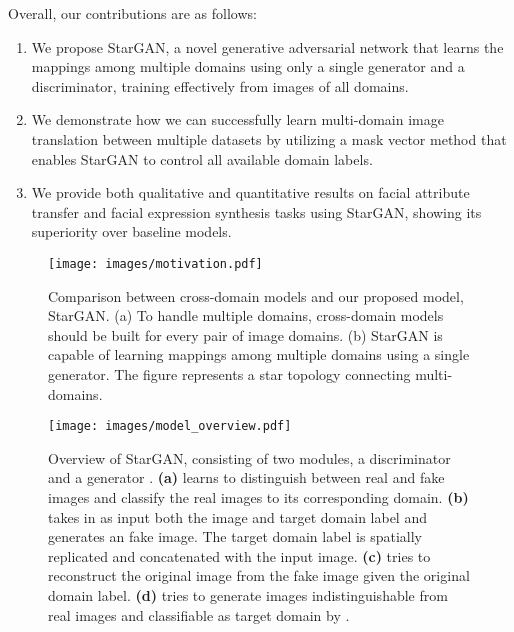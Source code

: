\documentclass[10pt,twocolumn,letterpaper]{article}
\begin{document}
\vspace{4px}

Overall, our contributions are as follows: 
\begin{enumerate}
\item[] We propose StarGAN, a novel generative adversarial network that learns the mappings among multiple domains using only a single generator and a discriminator, training effectively from images of all domains.
\item[] We demonstrate how we can successfully learn multi-domain image translation between multiple datasets by utilizing a mask vector method that enables StarGAN to control all available domain labels.
\item[] We provide both qualitative and quantitative results on facial attribute transfer and facial expression synthesis tasks using StarGAN, showing its superiority over baseline models.

\end{enumerate}




\begin{figure}[t]
\centering
\centerline{\texttt{[image: images/motivation.pdf]}}
\caption{Comparison between cross-domain models and our proposed model, StarGAN. (a) To handle multiple domains, cross-domain models should be built for every pair of image domains. (b) StarGAN is capable of learning mappings among multiple domains using a single generator. The figure represents a star topology connecting multi-domains.}
\label{motiv}
\end{figure}

\begin{figure*}[t]
\centering
\centerline{\texttt{[image: images/model\_overview.pdf]}}
\caption{Overview of StarGAN, consisting of two modules, a discriminator  and a generator . \textbf{(a)}  learns to distinguish between real and fake images and classify the real images to its corresponding domain. \textbf{(b)}  takes in as input both the image and target domain label and generates an fake image. The target domain label is spatially replicated and concatenated with the input image. \textbf{(c)}  tries to reconstruct the original image from the fake image given the original domain label. \textbf{(d)}  tries to generate images indistinguishable from real images and classifiable as target domain by .}
\label{model}
\end{figure*}

\vspace{-5px}
\end{document}
